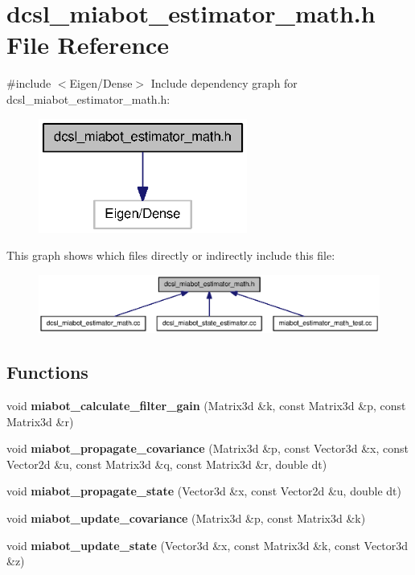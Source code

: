 \section{dcsl\-\_\-miabot\-\_\-estimator\-\_\-math.\-h \-File \-Reference}
\label{dcsl__miabot__estimator__math_8h}
{\ttfamily \#include $<$\-Eigen/\-Dense$>$}\*
\-Include dependency graph for dcsl\-\_\-miabot\-\_\-estimator\-\_\-math.\-h\-:
\nopagebreak
\begin{figure}[H]
\begin{center}
\leavevmode
\includegraphics[width=194pt]{dcsl__miabot__estimator__math_8h__incl}
\end{center}
\end{figure}
\-This graph shows which files directly or indirectly include this file\-:
\nopagebreak
\begin{figure}[H]
\begin{center}
\leavevmode
\includegraphics[width=350pt]{dcsl__miabot__estimator__math_8h__dep__incl}
\end{center}
\end{figure}
\subsection*{\-Functions}
\begin{DoxyCompactItemize}
\item 
void {\bf miabot\-\_\-calculate\-\_\-filter\-\_\-gain} (\-Matrix3d \&k, const \-Matrix3d \&p, const \-Matrix3d \&r)
\item 
void {\bf miabot\-\_\-propagate\-\_\-covariance} (\-Matrix3d \&p, const \-Vector3d \&x, const \-Vector2d \&u, const \-Matrix3d \&q, const \-Matrix3d \&r, double dt)
\item 
void {\bf miabot\-\_\-propagate\-\_\-state} (\-Vector3d \&x, const \-Vector2d \&u, double dt)
\item 
void {\bf miabot\-\_\-update\-\_\-covariance} (\-Matrix3d \&p, const \-Matrix3d \&k)
\item 
void {\bf miabot\-\_\-update\-\_\-state} (\-Vector3d \&x, const \-Matrix3d \&k, const \-Vector3d \&z)
\end{DoxyCompactItemize}


